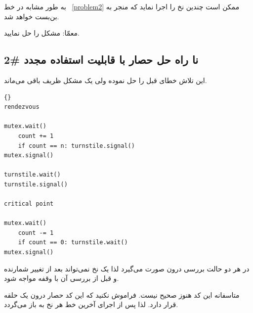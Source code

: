 \documentclass{book}
\newcommand{\clearemptydoublepage}{\newpage\cleardoublepage}
\begin{document}
    به طور مشابه در خط ~\ref{problem2} ممکن است چندین نخ   را اجرا نماید که منجر به بن‌بست خواهد شد. 

    معمّا: مشکل را حل نمایید. 

\clearemptydoublepage
\subsection {  نا راه حل حصار با قابلیت استفاده مجدد \#2}

    این تلاش خطای قبل را حل نموده ولی یک مشکل ظریف باقی می‌ماند. 

\begin{latin}
\begin{latin}
\begin{lstlisting}[title=\rl{{  نا راه حل حصار با قابلیت استفاده مجدد}}]{} 
rendezvous

mutex.wait()
    count += 1
    if count == n: turnstile.signal()
mutex.signal()

turnstile.wait()
turnstile.signal()

critical point

mutex.wait()
    count -= 1
    if count == 0: turnstile.wait()
mutex.signal()
\end{lstlisting}
\end{latin}
\end{latin}

    در هر دو حالت بررسی درون  صورت می‌گیرد لذا یک نخ نمی‌تواند بعد از تغییر شمارنده و قبل از بررسی آن با وقفه مواجه شود. 

    متاسفانه این کد هنوز صحیح نیست. فراموش نکنید که این کد حصار درون یک حلقه قرار دارد. لذا پس از اجرای آخرین خط 
    هر نخ به  باز می‌گردد. 
\end{document}
